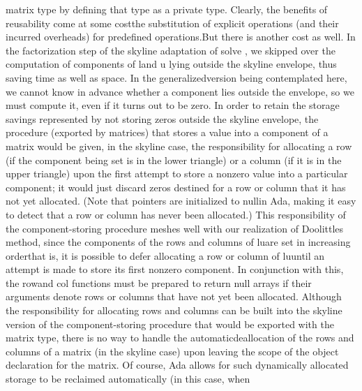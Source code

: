 matrix type by defining that type as a private type. Clearly, the
benefits of reusability come at some cost\EmDash[]the substitution
of explicit operations (and their incurred overheads) for predefined
operations.\Endpara[]
\Para[]But there is another cost as well. In the factorization step
of the skyline adaptation of \tyxffmxmono[]solve%
\tyxffmxendmono[], we skipped over the computation of components of
\tyxffmxmono[]l\tyxffmxendmono[] and \tyxffmxmono[]u%
\tyxffmxendmono[] lying outside the skyline envelope, thus saving
time as well as space. In the \ldquo[]generalized\rdquo[] version
being contemplated here, we cannot know in advance whether a component
lies outside the envelope, so we must compute it, even if it turns
out to be zero. In order to retain the storage savings represented
by not storing zeros outside the skyline envelope, the procedure (exported
by \tyxffmxmono[]matrices\tyxffmxendmono[]) that stores a value into
a component of a matrix would be given, in the skyline case, the responsibility
for allocating a row (if the component being set is in the lower triangle)
or a column (if it is in the upper triangle) upon the first attempt
to store a nonzero value into a particular component; it would just
discard zeros destined for a row or column that it has not yet allocated.
(Note that pointers are initialized to \tyxffmxmono[]%
\tyxtstxbf[]null\tyxtstxendbf[]\tyxffmxendmono[] in Ada, making it
easy to detect that a row or column has never been allocated.) This
responsibility of the component-storing procedure meshes well with
our realization of Doolittle\rsquo[]s method, since the components
of the rows and columns of \tyxffmxmono[]lu\tyxffmxendmono[] are set
in increasing order\EmDash[]that is, it is \txtxemph[]possible%
\txtxendemph[] to defer allocating a row or column of %
\tyxffmxmono[]lu\tyxffmxendmono[] until an attempt is made to store
its first nonzero component. In conjunction with this, the %
\tyxffmxmono[]row\tyxffmxendmono[] and \tyxffmxmono[]col%
\tyxffmxendmono[] functions must be prepared to return null arrays
if their arguments denote rows or columns that have not yet been allocated.
Although the responsibility for allocating rows and columns can be
built into the skyline version of the component-storing procedure
that would be exported with the matrix type, there is no way to handle
the \ldquo[]automatic\rdquo[] deallocation of the rows and columns
of a matrix (in the skyline case) upon leaving the scope of the object
declaration for the matrix. Of course, Ada allows for such dynamically
allocated storage to be reclaimed automatically (in this case, when

